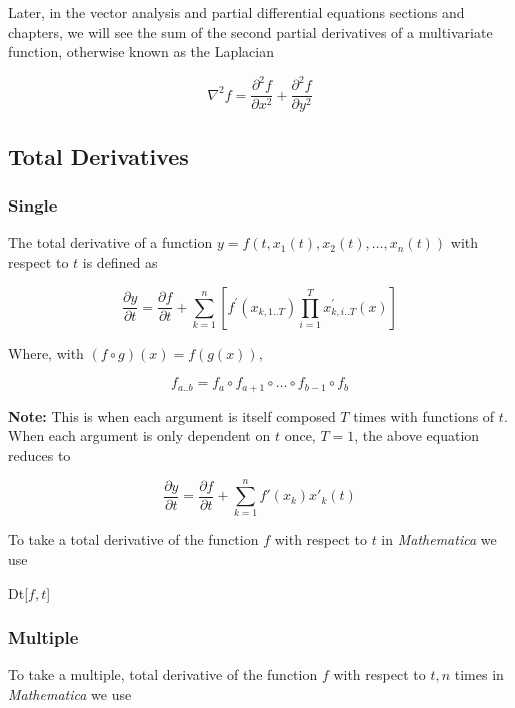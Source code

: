 \documentclass[11pt,letterpaper,twoside,titlepage]{book}
\newcommand{\Mathematica}{\textit{Mathematica} }
\begin{document}
						Later, in the vector analysis and  partial differential equations sections and chapters, we will see the sum of the second partial derivatives of a multivariate function, otherwise known as the Laplacian 
						
						\[ \nabla^2 f = \frac{\partial^2 f}{\partial x^2} + \frac{\partial^2 f}{\partial y^2} \]
					
				\subsection{Total Derivatives}
			
					\subsubsection{Single}
			
						The total derivative of a function $y = f(t,x_1(t),x_2(t),\dots,x_n(t))$ with respect to $t$ is defined as 
				
						\[ \frac{\partial y}{\partial t} = \frac{\partial f}{\partial t} + \sum_{k=1}^n \left[ f^\prime(x_{k,1..T} ) \prod_{i=1}^{T} x^\prime_{k,i..T}(x) \right] \]
				
						Where, with $(f \circ g)(x) = f(g(x))$,
				
						\[ f_{a..b} = f_a \circ f_{a+1} \circ \dots \circ f_{b-1} \circ f_b \]
				
						\textbf{Note:} This is when each argument is itself composed $T$ times with functions of $t$.  When each argument is only dependent on $t$ once, $T=1$, the above equation reduces to
				
						\[ \frac{\partial y}{\partial t} = \frac{\partial f}{\partial t} + \sum_{k=1}^n f'(x_k) x'_k(t) \]
				
						To take a total derivative of the function $f$ with respect to $t$ in \Mathematica we use 
					
						\begin{center}
					
							Dt[$f, t$]
					
						\end{center}
						
					\subsubsection{Multiple}
				
						To take a multiple, total derivative of the function $f$ with respect to $t, n$ times in \Mathematica we use 
					
\end{document}
